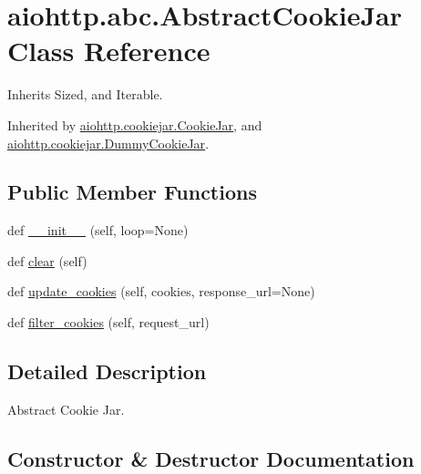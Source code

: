 \hypertarget{classaiohttp_1_1abc_1_1_abstract_cookie_jar}{}\section{aiohttp.\+abc.\+Abstract\+Cookie\+Jar Class Reference}
\label{classaiohttp_1_1abc_1_1_abstract_cookie_jar}


Inherits Sized, and Iterable.



Inherited by \hyperlink{classaiohttp_1_1cookiejar_1_1_cookie_jar}{aiohttp.\+cookiejar.\+Cookie\+Jar}, and \hyperlink{classaiohttp_1_1cookiejar_1_1_dummy_cookie_jar}{aiohttp.\+cookiejar.\+Dummy\+Cookie\+Jar}.

\subsection*{Public Member Functions}
\begin{DoxyCompactItemize}
\item 
def \hyperlink{classaiohttp_1_1abc_1_1_abstract_cookie_jar_a73bb8df478d8f8991bb6021d44fdeda0}{\+\_\+\+\_\+init\+\_\+\+\_\+} (self, loop=None)
\item 
def \hyperlink{classaiohttp_1_1abc_1_1_abstract_cookie_jar_a37eabb01e12bee6de52511f1112a883e}{clear} (self)
\item 
def \hyperlink{classaiohttp_1_1abc_1_1_abstract_cookie_jar_a0d992539787adb16027c9e959c8e699b}{update\+\_\+cookies} (self, cookies, response\+\_\+url=None)
\item 
def \hyperlink{classaiohttp_1_1abc_1_1_abstract_cookie_jar_a70ff587a4f911792e5ffa6e147f544b2}{filter\+\_\+cookies} (self, request\+\_\+url)
\end{DoxyCompactItemize}


\subsection{Detailed Description}
\begin{DoxyVerb}Abstract Cookie Jar.\end{DoxyVerb}
 

\subsection{Constructor \& Destructor Documentation}
\mbox{\label{classaiohttp_1_1abc_1_1_abstract_cookie_jar_a73bb8df478d8f8991bb6021d44fdeda0}} 

